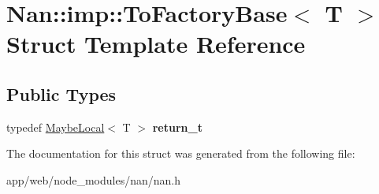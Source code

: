 \hypertarget{struct_nan_1_1imp_1_1_to_factory_base}{}\section{Nan\+:\+:imp\+:\+:To\+Factory\+Base$<$ T $>$ Struct Template Reference}
\label{struct_nan_1_1imp_1_1_to_factory_base}
\subsection*{Public Types}
\begin{DoxyCompactItemize}
\item 
\mbox{\label{struct_nan_1_1imp_1_1_to_factory_base_a302d9d819ef88681e33cc92070243d13}} 
typedef \hyperlink{class_nan_1_1_maybe_local}{Maybe\+Local}$<$ T $>$ {\bfseries return\+\_\+t}
\end{DoxyCompactItemize}


The documentation for this struct was generated from the following file\+:\begin{DoxyCompactItemize}
\item 
app/web/node\+\_\+modules/nan/nan.\+h\end{DoxyCompactItemize}
